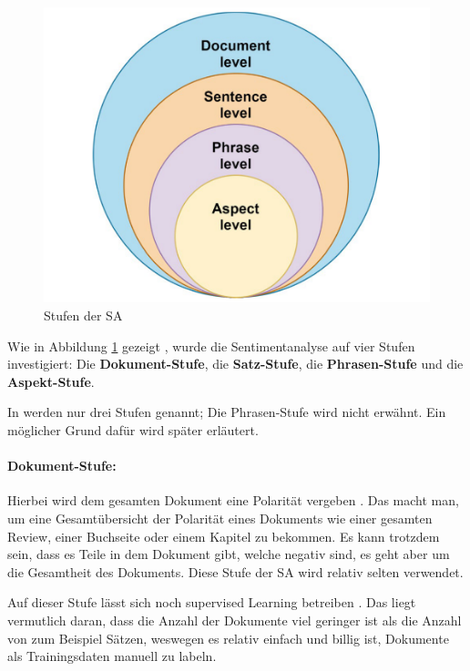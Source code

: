\begin{figure}
    \centering
    \includegraphics[scale=0.55]{images/dlengsteiner/sentimentanalasys_levels.png}
    \caption{Stufen der SA}
    \label{fig:sa-levels}
\end{figure}

Wie in Abbildung \ref{fig:sa-levels} gezeigt \cite[5734]{Wankhade2022sentiment}, wurde die Sentimentanalyse auf vier Stufen investigiert: Die \textbf{Dokument-Stufe}, die \textbf{Satz-Stufe}, die \textbf{Phrasen-Stufe} und die \textbf{Aspekt-Stufe}.

In \cite[21568]{amjad2023sentiment} werden nur drei Stufen genannt; Die Phrasen-Stufe wird nicht erwähnt. Ein möglicher Grund dafür wird später erläutert.

\paragraph{Dokument-Stufe:}

Hierbei wird dem gesamten Dokument eine Polarität vergeben \cite[5734]{Wankhade2022sentiment}\cite[21571]{amjad2023sentiment}. Das macht man, um eine Gesamtübersicht der Polarität eines Dokuments wie einer gesamten Review, einer Buchseite oder einem Kapitel zu bekommen. Es kann trotzdem sein, dass es Teile in dem Dokument gibt, welche negativ sind, es geht aber um die Gesamtheit des Dokuments. Diese Stufe der SA wird relativ selten verwendet.

Auf dieser Stufe lässt sich noch supervised Learning betreiben \cite[5734]{Wankhade2022sentiment}. Das liegt vermutlich daran, dass die Anzahl der Dokumente viel geringer ist als die Anzahl von zum Beispiel Sätzen, weswegen es relativ einfach und billig ist, Dokumente als Trainingsdaten manuell zu labeln.

